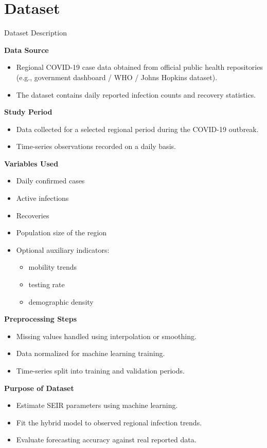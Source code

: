 \documentclass{beamer}
\begin{document}
\section{Dataset}
\begin{frame}[allowframebreaks]{Dataset Description}

\textbf{Data Source}

\begin{itemize}
\item Regional COVID-19 case data obtained from official public health repositories (e.g., government dashboard / WHO / Johns Hopkins dataset).
\item The dataset contains daily reported infection counts and recovery statistics.
\end{itemize}

\textbf{Study Period}

\begin{itemize}
\item Data collected for a selected regional period during the COVID-19 outbreak.
\item Time-series observations recorded on a daily basis.
\end{itemize}

\framebreak

\textbf{Variables Used}

\begin{itemize}
\item Daily confirmed cases
\item Active infections
\item Recoveries
\item Population size of the region
\item Optional auxiliary indicators:
\begin{itemize}
\item mobility trends
\item testing rate
\item demographic density
\end{itemize}
\end{itemize}

\textbf{Preprocessing Steps}

\begin{itemize}
\item Missing values handled using interpolation or smoothing.
\item Data normalized for machine learning training.
\item Time-series split into training and validation periods.
\end{itemize}

\framebreak

\textbf{Purpose of Dataset}

\begin{itemize}
\item Estimate SEIR parameters using machine learning.
\item Fit the hybrid model to observed regional infection trends.
\item Evaluate forecasting accuracy against real reported data.
\end{itemize}

\end{frame}
\end{document}
